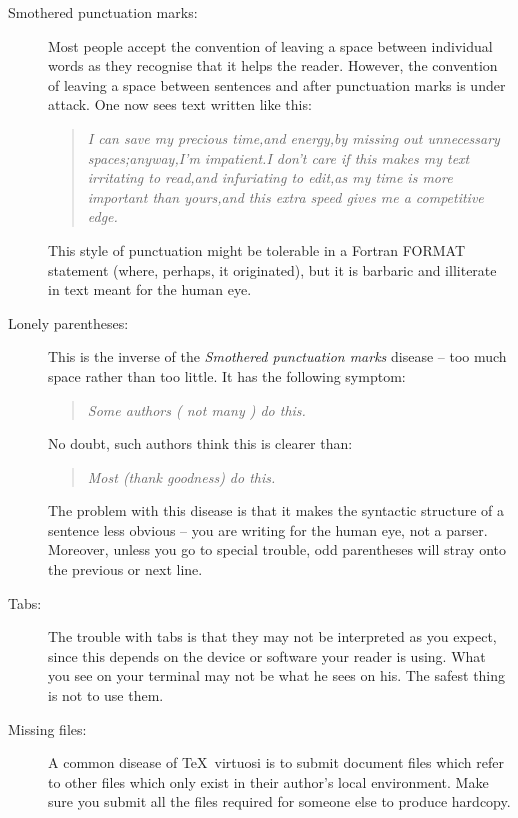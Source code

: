 \documentclass[twoside,11pt,nolof]{starlink}
\begin{document}
\begin{description}
\item [Smothered punctuation marks:]

Most people accept the convention of leaving a space between individual words
as they recognise that it helps the reader.
However, the convention of leaving a space between sentences and after
punctuation marks is under attack.
One now sees text written like this:
\begin{quote}
\emph{I can save my precious time,and energy,by missing out unnecessary
spaces;anyway,I'm impatient.I don't care if this makes my text
irritating to read,and infuriating to edit,as my time is more important than
yours,and this extra speed gives me a competitive edge.}
\end{quote}
This style of punctuation might be tolerable in a Fortran FORMAT statement
(where, perhaps, it originated), but it is barbaric and illiterate in text
meant for the human eye.

\item [Lonely parentheses:]

This is the inverse of the \emph{Smothered punctuation marks} disease\/ --
too much space rather than too little.
It has the following symptom:
\begin{quote}
\emph{Some authors ( not many ) do this.}
\end{quote}
No doubt, such authors think this is clearer than:
\begin{quote}
\emph{Most (thank goodness) do this.}
\end{quote}
The problem with this disease is that it makes the syntactic structure of a
sentence less obvious -- you are writing for the human eye, not a parser.
Moreover, unless you go to special trouble, odd parentheses will stray onto the
previous or next line.

\item [Tabs:]

The trouble with tabs is that they may not be interpreted as you expect, since
this depends on the device or software your reader is using.
What you see on your terminal may not be what he sees on his.
The safest thing is not to use them.

\item [Missing files:]

A common disease of \TeX\ virtuosi is to submit document files which refer to
other files which only exist in their author's local environment.
Make sure you submit all the files required for someone else to produce
hardcopy.


\end{description}
\end{document}
